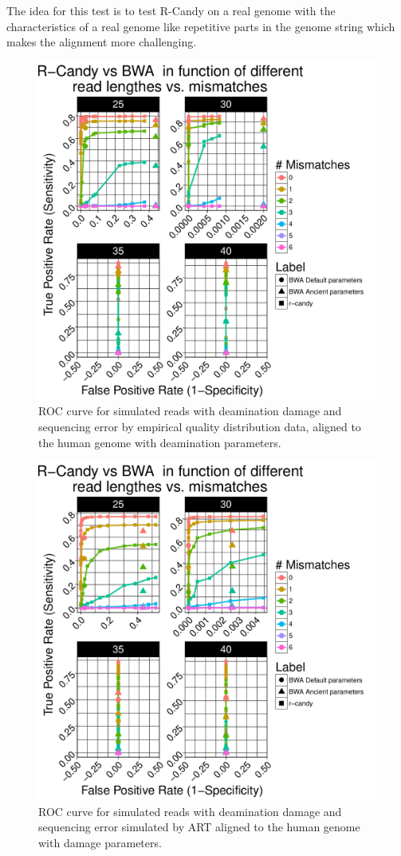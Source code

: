\documentclass[11pt,a4paper]{report}
\begin{document}
The idea for this test is to test R-Candy on a real genome with the characteristics of 
a real genome like repetitive parts in the genome string which makes the alignment more challenging.

\begin{figure}[H]
\centering
\includegraphics[width=12cm]{pictures/bROC_DS4_emp.pdf}
\caption{ROC curve for simulated reads with deamination damage and sequencing error by empirical quality distribution data, aligned to the human genome
         with deamination parameters.}
\label{DS4_emp}
\end{figure}

\begin{figure}[H]
\centering
\includegraphics[width=12cm]{pictures/bROC_DS4_ART.pdf}
\caption{ROC curve for simulated reads with deamination damage and sequencing error simulated by ART aligned to the human genome
         with damage parameters.}
\label{DS4_ART}
\end{figure}
\end{document}
